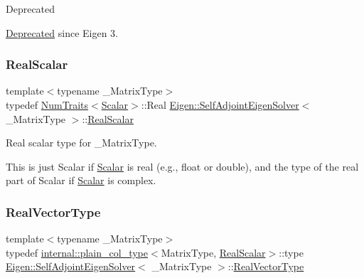 \begin{DoxyRefDesc}{Deprecated}
\item[\mbox{\hyperlink{deprecated__deprecated000023}{Deprecated}}]since Eigen 3. \end{DoxyRefDesc}
\mbox{\label{class_eigen_1_1_self_adjoint_eigen_solver_a5dae5f422a3c71060e6bd31332bf64fd}} 
\subsubsection{\texorpdfstring{RealScalar}{RealScalar}}
{\footnotesize\ttfamily template$<$typename \+\_\+\+Matrix\+Type$>$ \\
typedef \mbox{\hyperlink{struct_eigen_1_1_num_traits}{Num\+Traits}}$<$\mbox{\hyperlink{class_eigen_1_1_self_adjoint_eigen_solver_a0bfcedf4245b6846007ca4f01e4feb1f}{Scalar}}$>$\+::Real \mbox{\hyperlink{class_eigen_1_1_self_adjoint_eigen_solver}{Eigen\+::\+Self\+Adjoint\+Eigen\+Solver}}$<$ \+\_\+\+Matrix\+Type $>$\+::\mbox{\hyperlink{class_eigen_1_1_self_adjoint_eigen_solver_a5dae5f422a3c71060e6bd31332bf64fd}{Real\+Scalar}}}



Real scalar type for {\ttfamily \+\_\+\+Matrix\+Type}. 

This is just {\ttfamily Scalar} if \mbox{\hyperlink{class_eigen_1_1_self_adjoint_eigen_solver_a0bfcedf4245b6846007ca4f01e4feb1f}{Scalar}} is real (e.\+g., {\ttfamily float} or {\ttfamily double}), and the type of the real part of {\ttfamily Scalar} if \mbox{\hyperlink{class_eigen_1_1_self_adjoint_eigen_solver_a0bfcedf4245b6846007ca4f01e4feb1f}{Scalar}} is complex. \mbox{\label{class_eigen_1_1_self_adjoint_eigen_solver_acd090d5fdfc3cc017a13b6d8daa92287}} 
\subsubsection{\texorpdfstring{RealVectorType}{RealVectorType}}
{\footnotesize\ttfamily template$<$typename \+\_\+\+Matrix\+Type$>$ \\
typedef \mbox{\hyperlink{struct_eigen_1_1internal_1_1plain__col__type}{internal\+::plain\+\_\+col\+\_\+type}}$<$Matrix\+Type, \mbox{\hyperlink{class_eigen_1_1_self_adjoint_eigen_solver_a5dae5f422a3c71060e6bd31332bf64fd}{Real\+Scalar}}$>$\+::type \mbox{\hyperlink{class_eigen_1_1_self_adjoint_eigen_solver}{Eigen\+::\+Self\+Adjoint\+Eigen\+Solver}}$<$ \+\_\+\+Matrix\+Type $>$\+::\mbox{\hyperlink{class_eigen_1_1_self_adjoint_eigen_solver_acd090d5fdfc3cc017a13b6d8daa92287}{Real\+Vector\+Type}}}



